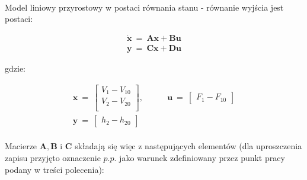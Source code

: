 \documentclass[a4paper,12pt]{article}
\begin{document}
\paragraph{}
Model liniowy przyrostowy w postaci równania stanu - równanie wyjścia jest postaci:

\begin{equation}
   \begin{gathered}
      \dot{\boldsymbol{x}} ~=~ \boldsymbol{Ax} + \boldsymbol{Bu}\\[0.1cm]
      \boldsymbol{y} ~=~ \boldsymbol{Cx} + \boldsymbol{Du}
   \end{gathered}
\end{equation}

\noindent gdzie:

\begin{equation}
   \begin{gathered}
      \boldsymbol{x} ~=~ \left[ 
      \begin{array}{c}
         V_1 - V_{10}\\
         V_2 - V_{20}\\
      \end{array}
      \right],
      ~~~~~~~~~~~~~
      \boldsymbol{u} ~=~ \left[ 
      \begin{array}{c}
         F_1 - F_{10}
      \end{array}
      \right]
      \\
      \boldsymbol{y} ~=~ \left[ 
      \begin{array}{c}
         h_2 - h_{20}
      \end{array}
      \right]
   \end{gathered}
\end{equation}

\paragraph{}
Macierze $\boldsymbol{A}, \boldsymbol{B}$ i $\boldsymbol{C}$ składają się więc z następujących elementów (dla uproszczenia zapisu przyjęto oznaczenie $p.p.$ jako warunek zdefiniowany przez punkt pracy podany w treści polecenia):
\end{document}
